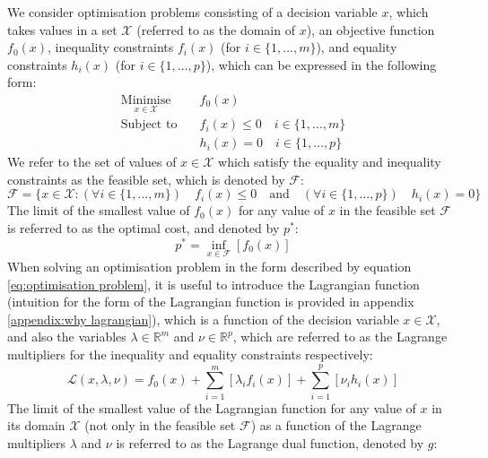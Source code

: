 We consider optimisation problems consisting of a decision variable $x$, which takes values in a set $\mathcal{X}$ (referred to as the domain of $x$), an objective function $f_0(x)$, inequality constraints $f_i(x)$ (for $i\in\{1, \hdots, m\}$), and equality constraints $h_i(x)$ (for $i\in\{1, \hdots, p\}$), which can be expressed in the following form:
\begin{equation}
\begin{aligned}
    \underset{x \in \mathcal{X}}{\text{Minimise}} \quad & f_0(x) \\
    \text{Subject to} \quad & f_i(x) \le 0 \quad i\in\{1, \hdots, m\} \\
    & h_i(x) = 0 \quad i\in\{1, \hdots, p\}
\end{aligned} \label{eq:optimisation problem}
\end{equation}
We refer to the set of values of $x\in\mathcal{X}$ which satisfy the equality and inequality constraints as the feasible set, which is denoted by $\mathcal{F}$:
\begin{equation}
    \mathcal{F} = \{ x\in\mathcal{X}: (\forall i\in\{1, \hdots, m\}) \quad f_i(x) \le 0 \quad \text{and} \quad (\forall i\in\{1, \hdots, p\}) \quad h_i(x) = 0 \} \label{eq:feasible set}
\end{equation}
The limit of the smallest value of $f_0(x)$ for any value of $x$ in the feasible set $\mathcal{F}$ is referred to as the optimal cost, and denoted by $p^*$:
\begin{equation}
    p^* = \underset{x\in\mathcal{F}}{\inf}\left[f_0(x)\right]
\end{equation}
When solving an optimisation problem in the form described by equation \ref{eq:optimisation problem}, it is useful to introduce the Lagrangian function \cite{boyd2004convex} (intuition for the form of the Lagrangian function is provided in appendix \ref{appendix:why lagrangian}), which is a function of the decision variable $x\in\mathcal{X}$, and also the variables $\lambda \in \mathbb{R}^m $ and $\nu\in\mathbb{R}^p$, which are referred to as the Lagrange multipliers for the inequality and equality constraints respectively:
\begin{equation}
    \mathcal{L}(x, \lambda, \nu) = f_0(x) + \sum_{i=1}^{m}[\lambda_i f_i(x)] + \sum_{i=1}^{p}[\nu_i h_i(x)] \label{eq:Lagrangian}
\end{equation}
The limit of the smallest value of the Lagrangian function for any value of $x$ in its domain $\mathcal{X}$ (not only in the feasible set $\mathcal{F}$) as a function of the Lagrange multipliers $\lambda$ and $\nu$ is referred to as the Lagrange dual function, denoted by $g$:
